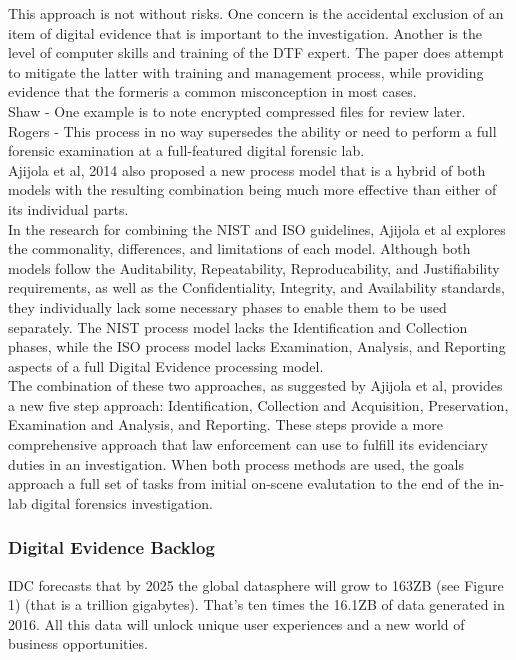 \documentclass[12pt]{article}
\begin{document}
This approach is not without risks.  One concern is the accidental exclusion of an item of digital evidence that is
important to the investigation.  Another is the level of computer skills and training of the DTF expert.  The paper
does attempt to mitigate the latter with training and management process, while providing evidence that the formeris a common misconception in most cases.\\

Shaw - One example is to note encrypted compressed files for review later.\\

Rogers - This process in no way supersedes the ability or need to perform a full forensic examination at a full-featured
digital forensic lab.\\

Ajijola et al, 2014\cite{ajijola2014review} also proposed a new process
model that is a hybrid of both models with the resulting combination being much more effective than either of its 
individual parts.\\

In the research for combining the NIST and ISO guidelines, Ajijola et al\cite{ajijola2014review} explores the
commonality, differences, and limitations of each model.  Although both models follow the Auditability,
Repeatability, Reproducability, and Justifiability requirements, as well as the Confidentiality, Integrity, and
Availability standards, they individually lack some necessary phases to enable them to be used separately.  The NIST
process model lacks the Identification and Collection phases, while the ISO process model lacks Examination, Analysis,
and Reporting aspects of a full Digital Evidence processing model.\\

The combination of these two approaches, as suggested by Ajijola et al\cite{ajijola2014review}, provides a new five 
step approach: Identification, Collection and Acquisition, Preservation, Examination and Analysis, and Reporting.
These steps provide a more comprehensive approach that law enforcement can use to fulfill its evidenciary duties in
an investigation.  When both process methods are used, the goals approach a full set of tasks from initial on-scene
evalutation to the end of the in-lab digital forensics investigation.\\

\subsubsection{Digital Evidence Backlog}
IDC forecasts that by 2025 the global datasphere will grow to 163ZB (see Figure 1) (that is a trillion gigabytes).
That's ten times the 16.1ZB of data generated in 2016. All this data will unlock unique user experiences and
a new world of business opportunities.\\
\end{document}
